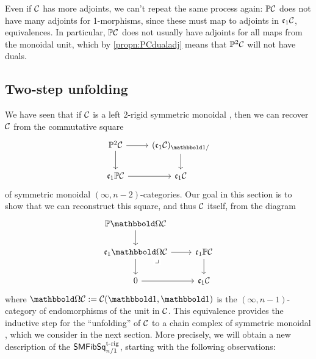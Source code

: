 \documentclass[a4paper,11pt]{article}
\begin{document}
\begin{warning}
  Even if $\mathcal{C}$ has more adjoints, we can't repeat the same process
  again: $\mathbb{P} \mathcal{C}$ does not have many adjoints for 1-morphisms, since
  these must map to adjoints in $\mathfrak{c}_{1}\mathcal{C}$, \ie{} equivalences. In
  particular, $\mathbb{P}\mathcal{C}$ does not usually have adjoints for all maps
  from the monoidal unit, which by \cref{propn:PCdualadj} means that
  $\mathbb{P}^{2}\mathcal{C}$ will not have duals.
\end{warning}

\subsection{Two-step unfolding}\label{sec:two-step}
We have seen that if $\mathcal{C}$ is a left 2-rigid symmetric monoidal \incat{},
then we can recover $\mathcal{C}$ from the commutative square
\[
  \begin{tikzcd}
   \mP^{2}\nC \ar[r] \ar[d] & (\core\nC)_{\bbone/}  \ar[d] \\
   \core\mP\nC \ar[r] & \core\nC
  \end{tikzcd}
\]
of symmetric monoidal $(\infty,n-2)$-categories. Our goal in this
section is to show that we can reconstruct this square, and thus $\mathcal{C}$
itself, from the diagram
\[
  \begin{tikzcd}
    \mP\mOm\nC  \ar[d]  \\
    \core\mOm \nC \ar[r] \ar[d] \drpullback & \core\mP\nC \ar[d] \\
     0 \ar[r] & \core\nC
  \end{tikzcd}
\]
where $\mOm \nC := \nC(\bbone, \bbone)$ is the $(\infty,n-1)$-category
of endomorphisms of the unit in $\mathcal{C}$. This equivalence provides
the inductive step for the ``unfolding'' of $\mathcal{C}$ to a chain complex
of symmetric monoidal \icats{}, which we consider in the next section.
More precisely, we will obtain a new description of the \icat{}
$\textup{\textsf{SMFibSq}}^{\text{\textup{t-rig}}}_{n/1}$, starting with the following
observations:
\end{document}
